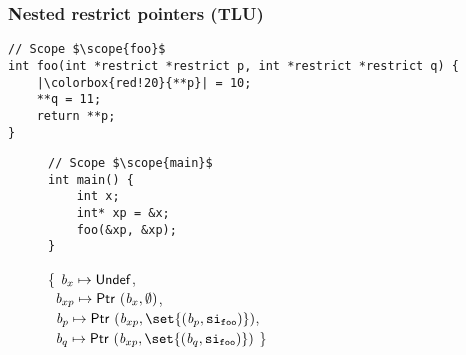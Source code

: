 \begin{frame}[fragile]
\frametitle{Nested restrict pointers (TLU)}
\begin{verbatim}
// Scope $\scope{foo}$
int foo(int *restrict *restrict p, int *restrict *restrict q) {
    |\colorbox{red!20}{**p}| = 10;
    **q = 11;
    return **p;
}
\end{verbatim}

\vspace*{-2cm}

\begin{figure}[!h]
\begin{minipage}[t]{.36\textwidth}
\begin{verbatim}
// Scope $\scope{main}$
int main() {
    int x;
    int* xp = &x;
    foo(&xp, &xp);
}
\end{verbatim}
\end{minipage}%
\begin{minipage}{.64\textwidth}

\executionannotation
{
\{ $\textit{b}_x \mapsto \mathsf{Undef}$, \\
    \ $\textit{b}_{xp} \mapsto \mathsf{Ptr} \ (\textit{b}_x, \emptyset)$, \\
    \ $\Blockvar_p \mapsto \ptr{(\Blockvar_{xp}, \set{(\Blockvar_p, \scope{foo})})}$, \\
    \ $\Blockvar_q \mapsto \ptr{(\Blockvar_{xp}, \set{(\Blockvar_q, \scope{foo})})}$ \}
}
{
}

\end{minipage}
\end{figure}

\end{frame}


